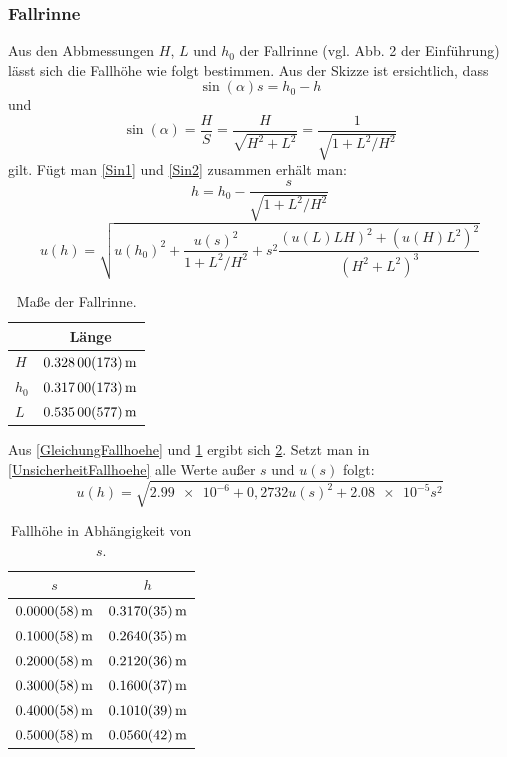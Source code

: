 \documentclass[
	a4paper,
	12pt,
	pagesize,
	ngerman
]{scrartcl}
\begin{document}
	\subsubsection{Fallrinne}
	Aus den Abbmessungen $H$, $L$ und $h_0$ der Fallrinne (vgl. Abb. 2 der Einführung) lässt sich die Fallhöhe wie folgt bestimmen. Aus der Skizze ist ersichtlich, dass 
	\begin{equation}
		\sin(\alpha) s = h_0-h 
		\label{Sin1}
	\end{equation}
	und
	\begin{equation}
		\sin(\alpha) = \frac{H}{S} = \frac{H}{\sqrt{H^2+L^2}} = \frac{1}{\sqrt{1+L^2/H^2}}
		\label{Sin2}
	\end{equation}
	gilt. Fügt man \cref{Sin1} und \cref{Sin2} zusammen erhält man:
	\begin{equation}
		h = h_0 - \frac{s}{\sqrt{1+ L^2/H^2}}
		\label{GleichungFallhoehe}
	\end{equation}
	\begin{equation}
		u(h) = \sqrt{u(h_0)^2 + \frac{u(s)^2}{1+L^2/H^2} + s^2\frac{(u(L)LH)^2 + (u(H)L^2)^2}{(H^2 + L^2)^3} }
		\label{UnsicherheitFallhoehe}
	\end{equation}
	\begin{table}[tb]
	\centering
	\begin{tabular}{  l | c  }
		& Länge  \\ \hline 
		$H$ &  $\SI{0,328 \pm 0,00173}{m}$ \\ \hline %
		$h_0$ &  $\SI{0,317 \pm 0,00173}{m}$ \\ \hline %
		$L$ &  $\SI{0,535 \pm 0,00577}{m}$ \\ %
	\end{tabular}
	\caption{Maße der Fallrinne.}
	\label{MessungFallrinne}
	\end{table}
	Aus \cref{GleichungFallhoehe} und \cref{MessungFallrinne} ergibt sich \cref{TabelleFallhoehe}. Setzt man in \cref{UnsicherheitFallhoehe} alle Werte außer $s$ und $u(s)$ folgt:
	\begin{equation}
		u(h) = \sqrt{ \SI{2,99e-6}+ 0,2732u(s)^2 + \SI{2,08e-5}s^2 }
	\end{equation}
	\begin{table}[tb]
	\centering
	\begin{tabular}{  c | c  }
		$s$  & $h$ \\ \hline 
		$\SI{0,00 \pm 0,0058}{m}$ &  $\SI{0,317 \pm 0,0035}{m}$ \\ \hline
		$\SI{0,10 \pm 0,0058}{m}$ &  $\SI{0,264 \pm 0,0035}{m}$ \\ \hline 
		$\SI{0,20 \pm 0,0058}{m}$ &  $\SI{0,212 \pm 0,0036}{m}$ \\ \hline
		$\SI{0,30 \pm 0,0058}{m}$ &  $\SI{0,160 \pm 0,0037}{m}$ \\ \hline
		$\SI{0,40 \pm 0,0058}{m}$ &  $\SI{0,101 \pm 0,0039}{m}$ \\ \hline 
		$\SI{0,50 \pm 0,0058}{m}$ &  $\SI{0,056 \pm 0,0042}{m}$ \\ 
	\end{tabular}
	\caption{Fallhöhe in Abhängigkeit von $s$.}
		\label{TabelleFallhoehe}
	\end{table}
\end{document}
